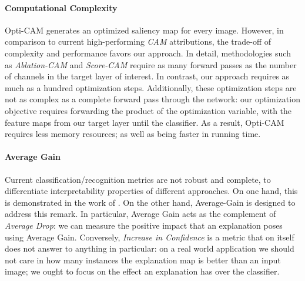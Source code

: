 \paragraph{Computational Complexity} Opti-CAM generates an optimized saliency map for every image. 
However, in comparison to current high-performing \emph{CAM} attributions, the trade-off of 
complexity and performance favors our approach. In detail, methodologies such as \emph{Ablation-CAM} and 
\emph{Score-CAM} require as many forward passes as the number of channels in the target layer of 
interest. In contrast, our approach requires as much as a hundred optimization steps. 
Additionally, these optimization steps are not as complex as a complete forward pass through the 
network: our optimization objective requires forwarding the product of the optimization variable,
with the feature maps from our target layer until the classifier. As a result, Opti-CAM requires
less memory resources; as well as being faster in running time.\\

\paragraph{Average Gain} Current classification/recognition metrics are not robust and complete,
to differentiate interpretability properties of different approaches. On one hand, this is 
demonstrated in the work of \autocite{poppi2021revisiting}. On the other hand, Average-Gain 
is designed to address this remark. In particular, Average Gain acts as the complement of 
\emph{Average Drop}: we can measure the positive impact that an explanation poses using Average 
Gain. Conversely, \emph{Increase in Confidence} is a metric that on itself does not answer to 
anything in particular: on a real world application we should not care in how many instances the 
explanation map is better than an input image; we ought to focus on the effect an explanation 
has over the classifier.\\